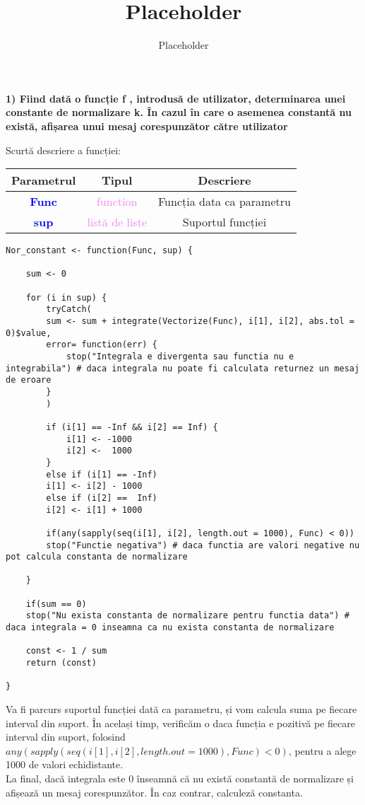 \documentclass[12pt]{article}
\title{Placeholder}
\author{Placeholder}
\begin{document}
	
\textbf{1) Fiind dată o funcție f , introdusă de utilizator, determinarea unei constante de
	normalizare k. În cazul în care o asemenea constantă nu există, afișarea unui mesaj
	corespunzător către utilizator}\vspace{5mm}

\indent Scurtă descriere a funcției: \\
\begin{center}
	\begin{tabular}{|| c | c | c ||}
		\hline
		Parametrul & Tipul & Descriere \\
		\hline
		\textbf{\textcolor{blue}{Func}} & \textcolor{violet}{function} & Funcția data ca parametru \\
		\hline
		\textbf{\textcolor{blue}{sup}} & \textcolor{violet}{listă de liste} & Suportul funcției \\
		\hline
	\end{tabular}
\end{center}
\begin{lstlisting}
Nor_constant <- function(Func, sup) {
	
	sum <- 0
	
	for (i in sup) {
		tryCatch(
		sum <- sum + integrate(Vectorize(Func), i[1], i[2], abs.tol = 0)$value,
		error= function(err) {
			stop("Integrala e divergenta sau functia nu e integrabila") # daca integrala nu poate fi calculata returnez un mesaj de eroare
		}
		)
		
		if (i[1] == -Inf && i[2] == Inf) {
			i[1] <- -1000
			i[2] <-  1000
		}
		else if (i[1] == -Inf)
		i[1] <- i[2] - 1000
		else if (i[2] ==  Inf)
		i[2] <- i[1] + 1000
		
		if(any(sapply(seq(i[1], i[2], length.out = 1000), Func) < 0))
		stop("Functie negativa") # daca functia are valori negative nu pot calcula constanta de normalizare
		
	}
	
	if(sum == 0)
	stop("Nu exista constanta de normalizare pentru functia data") # daca integrala = 0 inseamna ca nu exista constanta de normalizare
	
	const <- 1 / sum
	return (const)
	
}
\end{lstlisting}

\hfill Va fi parcurs suportul funcției dată ca parametru, și vom calcula suma pe fiecare interval din suport. În același timp, verificăm o daca funcția e pozitivă pe fiecare interval din suport, folosind $any(sapply(seq(i[1], i[2], length.out = 1000), Func) < 0)$, pentru a alege 1000 de valori echidistante.\hfill \\
\indent La final, dacă integrala este 0 înseamnă că nu există constantă de normalizare și afișează un mesaj corespunzător. În caz contrar, calculeză constanta.\hfill \\
\end{document}
